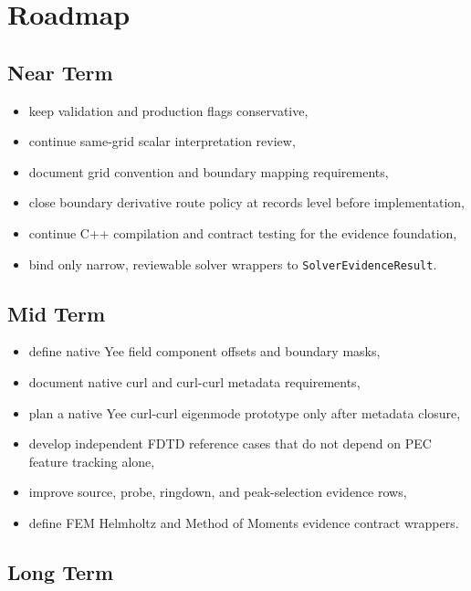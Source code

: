 \documentclass[11pt,a4paper]{article}
\newcommand{\code}[1]{\texttt{#1}}
\begin{document}
\section{Roadmap}
\label{sec:roadmap}

\subsection{Near Term}

\begin{itemize}
  \item keep validation and production flags conservative,
  \item continue same-grid scalar interpretation review,
  \item document grid convention and boundary mapping requirements,
  \item close boundary derivative route policy at records level before implementation,
  \item continue C++ compilation and contract testing for the evidence foundation,
  \item bind only narrow, reviewable solver wrappers to \code{SolverEvidenceResult}.
\end{itemize}

\subsection{Mid Term}

\begin{itemize}
  \item define native Yee field component offsets and boundary masks,
  \item document native curl and curl-curl metadata requirements,
  \item plan a native Yee curl-curl eigenmode prototype only after metadata closure,
  \item develop independent FDTD reference cases that do not depend on PEC feature tracking alone,
  \item improve source, probe, ringdown, and peak-selection evidence rows,
  \item define FEM Helmholtz and Method of Moments evidence contract wrappers.
\end{itemize}

\subsection{Long Term}
\end{document}

